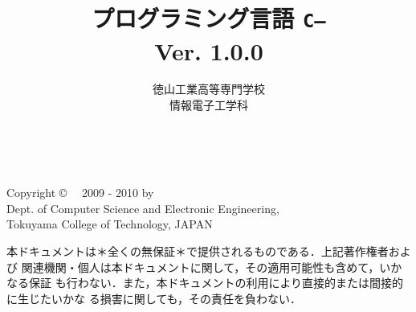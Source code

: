 \documentclass[11pt,a4j,twoside,dvipdfmx]{jbook}
\newcommand{\ver}{Ver. 1.0.0}
\newcommand{\cmm}{{\tt C--}}
\begin{document}
\setlength{\oddsidemargin}{10pt}
\setlength{\evensidemargin}{-10pt}
\setlength{\headsep}{1cm}

\title{プログラミング言語 \cmm \\\ver}
\author{徳山工業高等専門学校\\情報電子工学科}
\date{}

\maketitle

\thispagestyle{empty}
\onecolumn
~
\vfill
\begin{flushleft}
Copyright \copyright ~~ 2009 - 2010 by \\
Dept. of Computer Science and Electronic Engineering, \\
Tokuyama College of Technology, JAPAN
\end{flushleft}


\vspace{0.8cm}

本ドキュメントは＊全くの無保証＊で提供されるものである．上記著作権者および
関連機関・個人は本ドキュメントに関して，その適用可能性も含めて，いかなる保証
も行わない．また，本ドキュメントの利用により直接的または間接的に生じたいかな
る損害に関しても，その責任を負わない．
\setcounter{page}{0}

\newpage
{}
\tableofcontents

\onecolumn
~
\thispagestyle{empty}
\setcounter{page}{0}

\newpage
{}


\appendix

\pagestyle{empty}
\onecolumn
~
\end{document}
